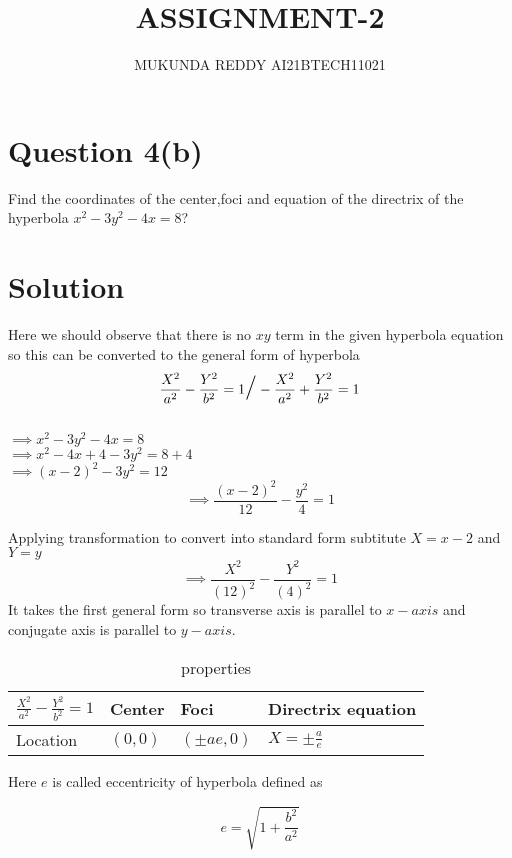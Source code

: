 \documentclass[journal,12pt,twocolumn]{article}
\newcommand{\generaleqa}{\frac{X^2}{a^2} - \frac{Y^2}{b^2} = 1}
\newcommand{\generaleqb}{-\frac{X^2}{a^2} + \frac{Y^2}{b^2} = 1}
\newcommand{\subtitute}[2]{\frac{X^2}{(#1)^2} - \frac{Y^2}{(#2)^2} = 1}
\begin{document}
\title{ASSIGNMENT-2}
\author{MUKUNDA REDDY AI21BTECH11021}
\date{}
\maketitle

\section*{\Large{Question 4(b)}}
Find the coordinates of the center,foci and equation of
the directrix of the hyperbola
$x^{2}-3y^{2}-4x=8$?\\
 \hline
\section*{Solution}
Here we should observe that there is no $xy$ term in the
given hyperbola equation so this can be converted to the
general form of hyperbola $$\generaleqa   \text{\LARGE$/$} \generaleqb$$\\

$\implies x^2-3y^2-4x = 8$\\
$\implies x^2-4x+4-3y^2 = 8+4$\\
$\implies (x-2)^2-3y^2 = 12$\\
\begin{equation}
\implies \frac{(x-2)^2}{12}-\frac{y^2}{4} = 1
\end{equation}

Applying transformation to convert into standard form
subtitute $X=x-2$ and $Y = y$ 
\begin{equation}
\implies \subtitute{12}{4}    
\end{equation}
It takes the first general form so transverse axis is parallel
to $x-axis$ and conjugate axis is parallel to $y-axis$.

\begin{table}[t]
    \centering
    \renewcommand{\arraystretch}{2}
    \begin{tabular}{|p{2.2cm}|p{1.2cm}|p{1.4cm}|p{1.6cm}|}
    \hline
    $\generaleqa$  & Center & Foci & Directrix equation\\ \hline
      Location  &   $(0,0)$ & $(\pm ae,0)$ & $X=\pm \frac{a}{e}$\\ \hline
    \end{tabular}
    \caption*{properties}
\end{table}

Here $e$ is called eccentricity of hyperbola defined as

\begin{equation}
\label{eccentricity}
 e=\sqrt{1+\frac{b^2}{a^2}} 
\end{equation}
\end{document}
